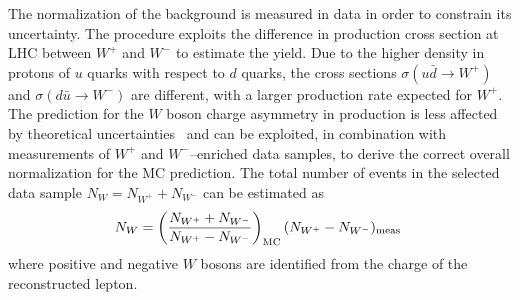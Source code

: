 The normalization of the \wjets{} background is measured in data in
order to constrain its uncertainty.
The procedure exploits the difference in production cross section at LHC
between $W^+$ and $W^-$ to estimate the \wjets{} yield.
Due to the higher density in protons of $u$ quarks with respect to $d$ quarks,
the cross sections $\sigma(u\bar{d}\to W^+)$ and $\sigma(d\bar{u}\to
W^-)$ are different, with a larger production rate expected for $W^+$. The
prediction for the $W$ boson charge asymmetry in \wjets{} production is less
affected by theoretical uncertainties~\cite{wasym} and can be
exploited, in combination with measurements of $W^+$ and
$W^-$--enriched data samples, to derive the correct overall normalization for the MC prediction.
The total number of \wjets{} events in the selected data sample
$N_{W}=N_{W^+}+N_{W^-}$ can be estimated as
\begin{equation}
N_{W} = \left(\frac{N_{W^+}+N_{W^-}}{N_{W^+}-N_{W^-}}\right )_{\rm
  MC}(N_{W^+}-N_{W^-})_{\rm meas}
\phantom{,}
\label{eq:nw}
\end{equation}
where positive and negative $W$ bosons are identified from the
charge of the reconstructed lepton. 


